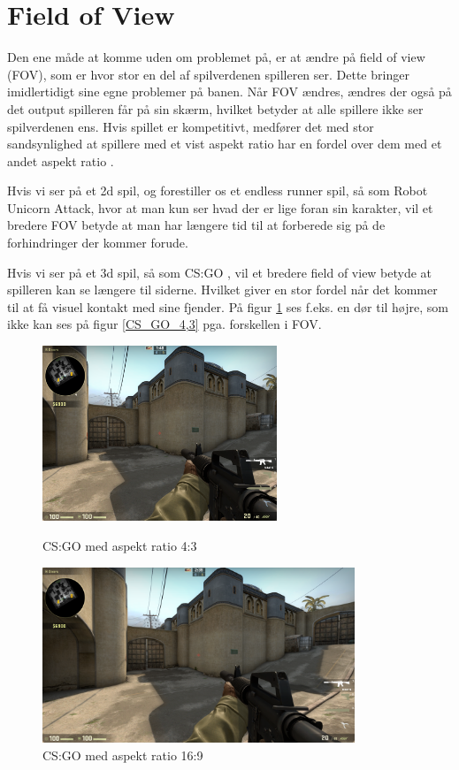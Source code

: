 \documentclass[Main.tex]{AspectRatio.tex}
\begin{document}
\section{Field of View}

Den ene måde at komme uden om problemet på, er at ændre på field of view (FOV), som er hvor stor en del af spilverdenen spilleren ser. Dette bringer imidlertidigt sine egne problemer på banen. Når FOV ændres, ændres der også på det output spilleren får på sin skærm, hvilket betyder at alle spillere ikke ser spilverdenen ens. Hvis spillet er kompetitivt, medfører det med stor sandsynlighed at spillere med et vist aspekt ratio har en fordel over dem med et andet aspekt ratio \cite{Atwood}.

Hvis vi ser på et 2d spil, og forestiller os et endless runner spil, så som Robot Unicorn Attack\cite{RUAGame}, hvor at man kun ser hvad der er lige foran sin karakter, vil et bredere FOV betyde at man har længere tid til at forberede sig på de forhindringer der kommer forude.

Hvis vi ser på et 3d spil, så som CS:GO \cite{CS:GOGame}, vil et bredere field of view betyde at spilleren kan se længere til siderne. Hvilket giver en stor fordel når det kommer til at få visuel kontakt med sine fjender. På figur \ref{CS_GO_16,9} ses f.eks. en dør til højre, som ikke kan ses på figur \ref{CS_GO_4,3} pga. forskellen i FOV.
\clearpage


\begin{figure}[h]
\centering
\parbox{7cm}{
\includegraphics[width = 7cm]{billeder/CS_GO_4,3}
\caption{CS:GO med aspekt ratio 4:3}    
\label{CS_GO_4,3}}
\qquad
\begin{minipage}{9.33cm}
\includegraphics[width = 9.33cm]{billeder/CS_GO_16,9}
\caption{CS:GO med aspekt ratio 16:9}    
\label{CS_GO_16,9}
\end{minipage}
\end{figure} 
\end{document}
